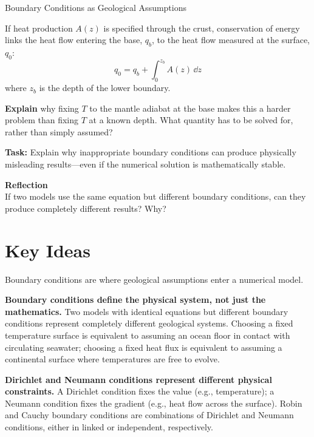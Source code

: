 \begin{activity}{Boundary Conditions as Geological Assumptions}
\begin{questions}
    If heat production $A(z)$ is specified through the crust, conservation of energy links the heat flow entering the base, $q_b$, to the heat flow measured at the surface, $q_0$:
    \[
        q_0 = q_b + \int_0^{z_b} A(z)\,\dd z
    \]
    where $z_b$ is the depth of the lower boundary.

    \textbf{Explain} why fixing $T$ to the mantle adiabat at the base makes this a harder problem than fixing $T$ at a known depth. What quantity has to be solved for, rather than simply assumed?
    \answerbox[4cm]

    \textbf{Task:}
    Explain why inappropriate boundary conditions can produce physically misleading results—even if the numerical solution is mathematically stable.
    \answerbox[3cm]

    \textbf{Reflection} \\
    If two models use the same equation but different boundary conditions, can they produce completely different results? Why?
    \answerbox[3cm]
\end{questions}

\bigskip

\section*{Key Ideas}

Boundary conditions are where geological assumptions enter a numerical model.

\textbf{Boundary conditions define the physical system, not just the mathematics.} Two models with identical equations but different boundary conditions represent completely different geological systems. Choosing a fixed temperature surface is equivalent to assuming an ocean floor in contact with circulating seawater; choosing a fixed heat flux is equivalent to assuming a continental surface where temperatures are free to evolve.

\textbf{Dirichlet and Neumann conditions represent different physical constraints.} A Dirichlet condition fixes the value (e.g., temperature); a Neumann condition fixes the gradient (e.g., heat flow across the surface). Robin and Cauchy boundary conditions are combinations of Dirichlet and Neumann conditions, either in linked or independent, respectively.


\end{activity}
